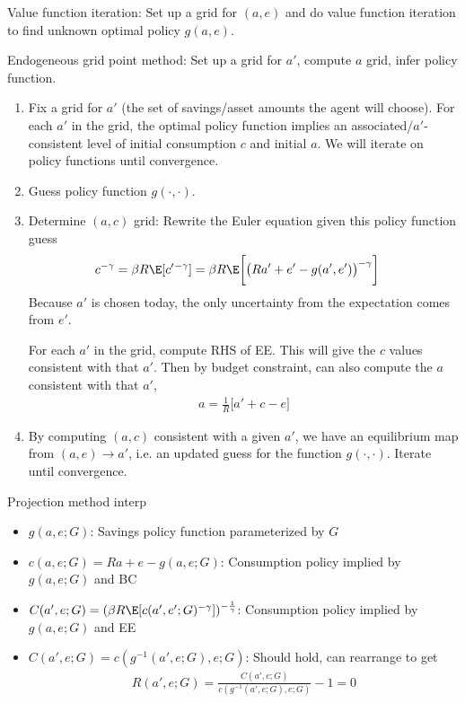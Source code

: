 \documentclass[12pt]{article}
\theoremstyle{plain}
\theoremstyle{definition}
\theoremstyle{remark}
\newcommand{\ra}{\rightarrow}
\begin{document}
Value function iteration:
Set up a grid for $(a,e)$ and do value function iteration to find
unknown optimal policy $g(a,e)$.

Endogeneous grid point method:
Set up a grid for $a'$, compute $a$ grid, infer policy function.
\begin{enumerate}
  \item Fix a grid for $a'$ (the set of savings/asset amounts the agent
    will choose).
    For each $a'$ in the grid, the optimal policy function implies an
    associated/$a'$-consistent level of initial consumption $c$ and
    initial $a$.
    We will iterate on policy functions until convergence.

  \item Guess policy function $g(\cdot,\cdot)$.

  \item
    Determine $(a,c)$ grid:
    Rewrite the Euler equation given this policy function guess
    \begin{align*}
      c^{-\gamma}
      &=
      \beta R
      \E[c'{}^{-\gamma}]
      =
      \beta R
      \E\bigg[
        \big(
        Ra' + e' - g(a',e')
        \big)^{-\gamma}
      \bigg]
    \end{align*}
    Because $a'$ is chosen today, the only uncertainty from the
    expectation comes from $e'$.


    For each $a'$ in the grid, compute RHS of EE.
    This will give the $c$ values consistent with that $a'$.
    Then by budget constraint, can also compute the $a$ consistent with
    that $a'$,
    \begin{align*}
      a =
      \frac{1}{R}
      \big[
      a' + c - e
      \big]
    \end{align*}

  \item
    By computing $(a,c)$ consistent with a given $a'$, we have an
    equilibrium map from $(a,e)\ra a'$, i.e. an updated guess for the
    function $g(\cdot,\cdot)$.
    Iterate until convergence.
\end{enumerate}
Projection method interp
\begin{itemize}
  \item $g(a,e;G)$: Savings policy function parameterized by $G$
  \item $c(a,e;G)=Ra+e-g(a,e;G)$: Consumption
    policy implied by $g(a,e;G)$ and BC
  \item $C(a',e;G)=(\beta R\E[c(a',e';G)^{-\gamma}])^{-\frac{1}{\gamma}}$:
    Consumption policy implied by $g(a,e;G)$ and EE
  \item $C(a',e;G)=c(g^{-1}(a',e;G),e;G)$: Should hold, can rearrange to
    get
    \begin{align*}
      R(a',e;G)
      = \frac{C(a',e;G)}{c(g^{-1}(a',e;G),e;G)} - 1
      = 0
    \end{align*}
\end{itemize}
\end{document}
